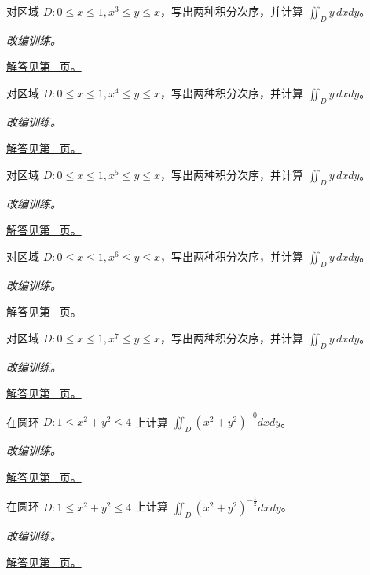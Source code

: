 \documentclass[UTF8,12pt,a4paper,fontset=fandol]{ctexart}
\begin{document}
\begin{example}[两条曲线之间的换序]\label{ex:c37q8}
对区域 $D:0\le x\le1, x^{3}\le y\le x$，写出两种积分次序，并计算 $\iint_Dy\,dxdy$。
\par\textit{改编训练。}\par\hyperref[ans:c37q8]{解答见第~\pageref{ans:c37q8} 页。}
\end{example}
\begin{example}[两条曲线之间的换序]\label{ex:c37q9}
对区域 $D:0\le x\le1, x^{4}\le y\le x$，写出两种积分次序，并计算 $\iint_Dy\,dxdy$。
\par\textit{改编训练。}\par\hyperref[ans:c37q9]{解答见第~\pageref{ans:c37q9} 页。}
\end{example}
\begin{example}[两条曲线之间的换序]\label{ex:c37q10}
对区域 $D:0\le x\le1, x^{5}\le y\le x$，写出两种积分次序，并计算 $\iint_Dy\,dxdy$。
\par\textit{改编训练。}\par\hyperref[ans:c37q10]{解答见第~\pageref{ans:c37q10} 页。}
\end{example}
\begin{example}[两条曲线之间的换序]\label{ex:c37q11}
对区域 $D:0\le x\le1, x^{6}\le y\le x$，写出两种积分次序，并计算 $\iint_Dy\,dxdy$。
\par\textit{改编训练。}\par\hyperref[ans:c37q11]{解答见第~\pageref{ans:c37q11} 页。}
\end{example}
\begin{example}[两条曲线之间的换序]\label{ex:c37q12}
对区域 $D:0\le x\le1, x^{7}\le y\le x$，写出两种积分次序，并计算 $\iint_Dy\,dxdy$。
\par\textit{改编训练。}\par\hyperref[ans:c37q12]{解答见第~\pageref{ans:c37q12} 页。}
\end{example}
\begin{example}[圆环上的径向负幂]\label{ex:c37q13}
在圆环 $D:1\le x^2+y^2\le4$ 上计算 $\iint_D(x^2+y^2)^{-0}dxdy$。
\par\textit{改编训练。}\par\hyperref[ans:c37q13]{解答见第~\pageref{ans:c37q13} 页。}
\end{example}
\begin{example}[圆环上的径向负幂]\label{ex:c37q14}
在圆环 $D:1\le x^2+y^2\le4$ 上计算 $\iint_D(x^2+y^2)^{-\frac{1}{2}}dxdy$。
\par\textit{改编训练。}\par\hyperref[ans:c37q14]{解答见第~\pageref{ans:c37q14} 页。}
\end{example}
\end{document}
